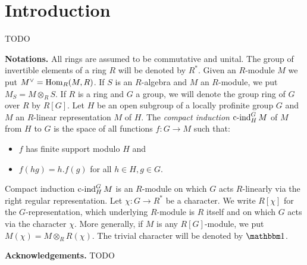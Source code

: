 \section*{Introduction}

TODO

\smallskip
\textbf{Notations.}
All rings are assumed to be commutative and unital.
The group of invertible elements of a ring $R$ will be denoted by $R^{\ast}$.
Given an $R$-module $M$ we put $M^{\vee}=\operatorname{Hom}_R(M,R)$.
If $S$ is an $R$-algebra and $M$ an $R$-module, we put $M_S=M\otimes_R S.$
If $R$ is a ring and $G$ a group, we will denote the group ring of $G$ over $R$ by $R[G]$.
Let $H$ be an open subgroup of a locally profinite group $G$ and $M$ an $R$-linear representation $M$ of $H$.
The \textit{compact induction} $\operatorname{c-ind}^{G}_{H}M$ of $M$ from $H$ to $G$ is the space of all functions $f\colon G\to M$ such that:
\begin{itemize}
\item $f$ has finite support modulo $H$ and
\item $f(hg)=h.f(g)$ for all $h\in H, g\in G$.
\end{itemize}
Compact induction $\operatorname{c-ind}^{G}_{H}M$ is an $R$-module on which $G$ acts $R$-linearly via the right regular representation.
Let $\chi\colon G\to R^{\ast}$ be a character.
We write $R[\chi]$ for the $G$-representation, which underlying $R$-module is $R$ itself and on which $G$ acts via the character $\chi$.
More generally, if $M$ is any $R[G]$-module, we put $M(\chi)=M\otimes_R R(\chi).$
The trivial character will be denoted by $\cf$.

\smallskip
\textbf{Acknowledgements.}
TODO